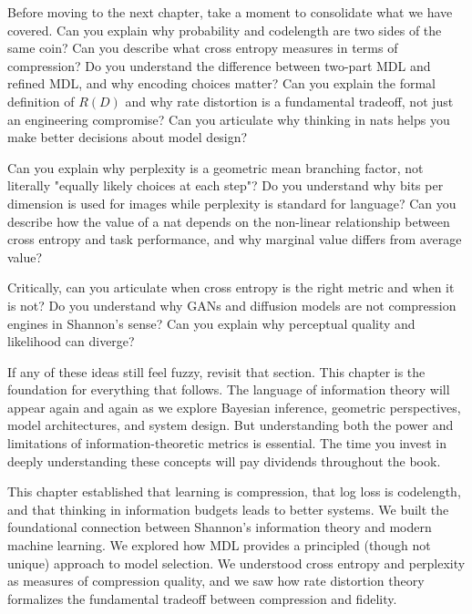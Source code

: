 \begin{pausebox}
Before moving to the next chapter, take a moment to consolidate what we have covered. Can you explain why probability and codelength are two sides of the same coin? Can you describe what cross entropy measures in terms of compression? Do you understand the difference between two-part MDL and refined MDL, and why encoding choices matter? Can you explain the formal definition of $R(D)$ and why rate distortion is a fundamental tradeoff, not just an engineering compromise? Can you articulate why thinking in nats helps you make better decisions about model design?

\vspace{0.5em}

Can you explain why perplexity is a geometric mean branching factor, not literally "equally likely choices at each step"? Do you understand why bits per dimension is used for images while perplexity is standard for language? Can you describe how the value of a nat depends on the non-linear relationship between cross entropy and task performance, and why marginal value differs from average value?

\vspace{0.5em}

Critically, can you articulate when cross entropy is the right metric and when it is not? Do you understand why GANs and diffusion models are not compression engines in Shannon's sense? Can you explain why perceptual quality and likelihood can diverge?

\vspace{0.5em}

If any of these ideas still feel fuzzy, revisit that section. This chapter is the foundation for everything that follows. The language of information theory will appear again and again as we explore Bayesian inference, geometric perspectives, model architectures, and system design. But understanding both the power and limitations of information-theoretic metrics is essential. The time you invest in deeply understanding these concepts will pay dividends throughout the book.
\end{pausebox}

\vspace{1em}

This chapter established that learning is compression, that log loss is codelength, and that thinking in information budgets leads to better systems. We built the foundational connection between Shannon's information theory and modern machine learning. We explored how MDL provides a principled (though not unique) approach to model selection. We understood cross entropy and perplexity as measures of compression quality, and we saw how rate distortion theory formalizes the fundamental tradeoff between compression and fidelity.

